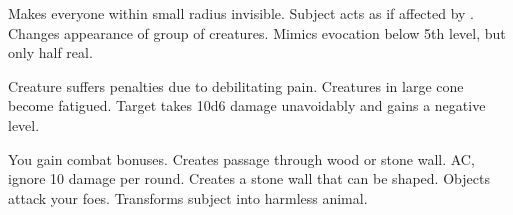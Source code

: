 \begin{swspelllist}
   Makes everyone within small radius invisible.
   Subject acts as if affected by .
   Changes appearance of group of creatures.
   Mimics evocation below 5th level, but only half real.

   Creature suffers penalties due to debilitating pain.
   Creatures in large cone become fatigued.
   Target takes 10d6 damage unavoidably and gains a negative level.
  \spellheadrestricted{}

  \M You gain combat bonuses.
   Creates passage through wood or stone wall.
    AC, ignore 10 damage per round.
   Creates a stone wall that can be shaped.
   Objects attack your foes.
   Transforms subject into harmless animal.
\end{swspelllist}

